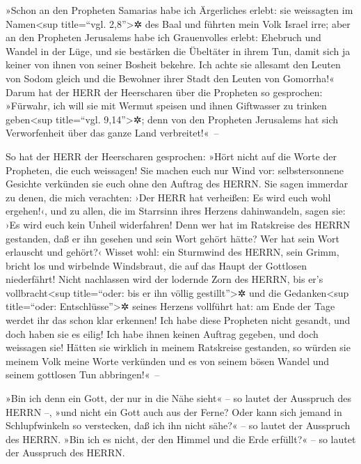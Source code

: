 »Schon an den Propheten Samarias habe ich Ärgerliches
erlebt: sie weissagten im Namen\textless sup title=``vgl.
2,8''\textgreater✲ des Baal und führten mein Volk Israel irre;
aber an den Propheten Jerusalems habe ich Grauenvolles
erlebt: Ehebruch und Wandel in der Lüge, und sie bestärken die Übeltäter
in ihrem Tun, damit sich ja keiner von ihnen von seiner Bosheit bekehre.
Ich achte sie allesamt den Leuten von Sodom gleich und die Bewohner
ihrer Stadt den Leuten von Gomorrha!« Darum hat der HERR
der Heerscharen über die Propheten so gesprochen: »Fürwahr, ich will sie
mit Wermut speisen und ihnen Giftwasser zu trinken geben\textless sup
title=``vgl. 9,14''\textgreater✲; denn von den Propheten Jerusalems hat
sich Verworfenheit über das ganze Land verbreitet!«~--

So hat der HERR der Heerscharen gesprochen: »Hört nicht
auf die Worte der Propheten, die euch weissagen! Sie machen euch nur
Wind vor: selbstersonnene Gesichte verkünden sie euch ohne den Auftrag
des HERRN. Sie sagen immerdar zu denen, die mich
verachten: ›Der HERR hat verheißen: Es wird euch wohl ergehen!‹, und zu
allen, die im Starrsinn ihres Herzens dahinwandeln, sagen sie: ›Es wird
euch kein Unheil widerfahren! Denn wer hat im Ratskreise
des HERRN gestanden, daß er ihn gesehen und sein Wort gehört hätte? Wer
hat sein Wort erlauscht und gehört?‹ Wisset wohl: ein
Sturmwind des HERRN, sein Grimm, bricht los und wirbelnde Windsbraut,
die auf das Haupt der Gottlosen niederfährt! Nicht
nachlassen wird der lodernde Zorn des HERRN, bis er's
vollbracht\textless sup title=``oder: bis er ihn völlig
gestillt''\textgreater✲ und die Gedanken\textless sup title=``oder:
Entschlüsse''\textgreater✲ seines Herzens vollführt hat: am Ende der
Tage werdet ihr das schon klar erkennen! Ich habe diese
Propheten nicht gesandt, und doch haben sie es eilig! Ich habe ihnen
keinen Auftrag gegeben, und doch weissagen sie! Hätten
sie wirklich in meinem Ratskreise gestanden, so würden sie meinem Volk
meine Worte verkünden und es von seinem bösen Wandel und seinem
gottlosen Tun abbringen!«~--

»Bin ich denn ein Gott, der nur in die Nähe sieht« -- so
lautet der Ausspruch des HERRN --, »und nicht ein Gott auch aus der
Ferne? Oder kann sich jemand in Schlupfwinkeln so
verstecken, daß ich ihn nicht sähe?« -- so lautet der Ausspruch des
HERRN. »Bin ich es nicht, der den Himmel und die Erde erfüllt?« -- so
lautet der Ausspruch des HERRN.


